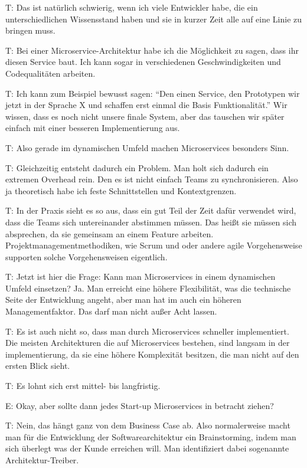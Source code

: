 T: Das ist natürlich schwierig, wenn ich viele Entwickler habe, die ein unterschiedlichen Wissensstand haben und sie in kurzer Zeit alle auf eine Linie zu bringen muss.

\label{appendix:t-7}
T: Bei einer Microservice-Architektur habe ich die Möglichkeit zu sagen, dass ihr diesen Service baut. Ich kann sogar in verschiedenen Geschwindigkeiten und Codequalitäten arbeiten.

T: Ich kann zum Beispiel bewusst sagen: “Den einen Service, den Prototypen wir jetzt in der Sprache X und schaffen erst einmal die Basis Funktionalität.” Wir wissen, dass es noch nicht unsere finale System, aber das tauschen wir später einfach mit einer besseren Implementierung aus.

\label{appendix:t-8}
T: Also gerade im dynamischen Umfeld machen Microservices besonders Sinn.

\label{appendix:t-9}
T: Gleichzeitig entsteht dadurch ein Problem. Man holt sich dadurch ein extremen Overhead rein. Den es ist nicht einfach Teams zu synchronisieren. Also ja theoretisch habe ich feste Schnittstellen und Kontextgrenzen.

\label{appendix:t-10}
T: In der Praxis sieht es so aus, dass ein gut Teil der Zeit dafür verwendet wird, dass die Teams sich untereinander abstimmen müssen. Das heißt sie müssen sich absprechen, da sie gemeinsam an einem Feature arbeiten. Projektmanagementmethodiken, wie Scrum und oder andere agile Vorgehensweise supporten solche Vorgehensweisen eigentlich.

\label{appendix:t-11} \label{appendix:t-12}
T: Jetzt ist hier die Frage: Kann man Microservices in einem dynamischen Umfeld einsetzen?  Ja. Man erreicht eine höhere Flexibilität, was die technische Seite der Entwicklung angeht, aber man hat im auch ein höheren Managementfaktor. Das darf man nicht außer Acht lassen.

T: Es ist auch nicht so, dass man durch Microservices schneller implementiert. Die meisten Architekturen die auf Microservices bestehen, sind langsam in der implementierung, da sie eine höhere Komplexität besitzen, die man nicht auf den ersten Blick sieht.

\label{appendix:t-13}
T: Es lohnt sich erst mittel- bis langfristig.

E: Okay, aber sollte dann jedes Start-up Microservices in betracht ziehen?

\label{appendix:t-14}
T: Nein, das hängt ganz von dem Business Case ab. Also normalerweise macht man für die Entwicklung der Softwarearchitektur ein Brainstorming, indem man sich überlegt was der Kunde erreichen will. Man identifiziert dabei sogenannte Architektur-Treiber.

